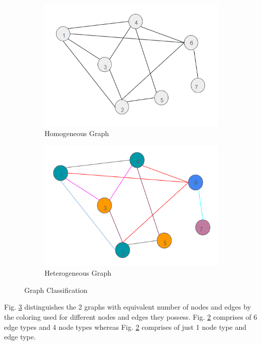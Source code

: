 \documentclass{report} %
\begin{document}
\begin{figure}[H]
    \centering
    \begin{subfigure}{0.35\textwidth}
        \centering
        \includegraphics[width=\textwidth]{./ReportImages/HomogeneousGraph.png}
        \caption{Homogeneous Graph} %
        \label{fig:Homogeneous Graph}
    \end{subfigure}
    \begin{subfigure}{0.35\textwidth}
        \centering
        \includegraphics[width=\textwidth]{./ReportImages/HeterogeneousGraph.png}
        \caption{Heterogeneous Graph}
        \label{fig:Heterogeneous Graph}
    \end{subfigure}
    \caption{Graph Classification}
    \label{fig:Graph Classification}
\end{figure}
Fig. \ref{fig:Graph Classification} distinguishes the 2 graphs with equivalent number of nodes and edges by the coloring used for different nodes and edges they possess. 
Fig. \ref{fig:Heterogeneous Graph} comprises of 6 edge types and 4 node types whereas Fig. \ref{fig:Heterogeneous Graph} comprises of just 1 node type and edge type.
\end{document}
